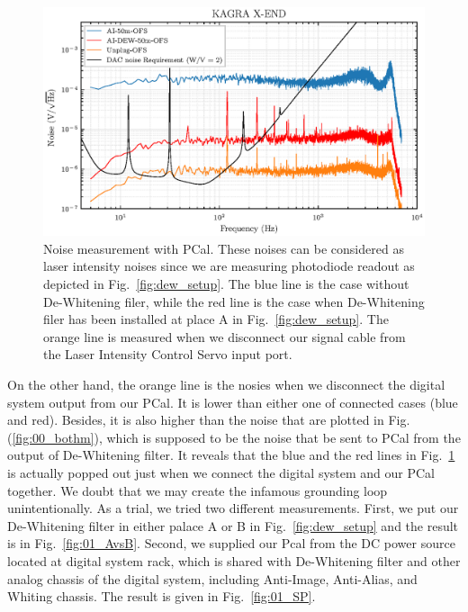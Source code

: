 \begin{figure}[hbt!]
\centering
\includegraphics[width=1\textwidth]{figure/noise/01_all}
\caption[Noise measurement with PCal]{ Noise measurement with PCal. These noises can be considered as laser intensity noises since we are measuring photodiode readout as depicted in Fig.~\ref{fig:dew_setup}. The blue line is the case without De-Whitening filer, while the red line is the case when De-Whitening filer has been installed at place A in Fig.~\ref{fig:dew_setup}. The orange line is measured when we disconnect our signal cable from the Laser Intensity Control Servo input port.}
\label{fig:01_all}
\end{figure}

On the other hand, the orange line is the nosies when we disconnect the digital system output from our PCal. It is lower than either one of connected cases (blue and red). Besides, it is also higher than the noise that are plotted in Fig.(\ref{fig:00_bothm}), which is supposed to be the noise that be sent to PCal from the output of De-Whitening filter. It reveals that the blue and the red lines in Fig.~\ref{fig:01_all} is actually popped out just when we connect the digital system and our PCal together. We doubt that we may create the infamous grounding loop unintentionally. As a trial, we tried two different measurements. First, we put our De-Whitening filter in either palace A or B in Fig.~\ref{fig:dew_setup} and the result is in Fig.~\ref{fig:01_AvsB}. Second, we supplied our Pcal from the DC power source located at digital system rack, which is shared with De-Whitening filter and other analog chassis of the digital system, including Anti-Image, Anti-Alias, and Whiting chassis. The result is given in Fig.~\ref{fig:01_SP}.

